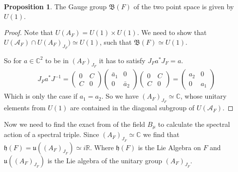 \documentclass[a4paper]{article}
\theoremstyle{definition}
\theoremstyle{definition}
\theoremstyle{definition}
\theoremstyle{theorem}
\theoremstyle{theorem}
\theoremstyle{theorem}
\newtheorem{proposition}{Proposition}
\begin{document}
    \begin{proposition}
        The Gauge group $\mathfrak{B}(F)$ of the two point space is given by
        $U(1)$.
    \end{proposition}
    \begin{proof}
        Note that $U(A_F) = U(1) \times U(1)$. We need to show that
        $U(\mathcal{A}_F)
        \cap U(A_F)_{J_F}) \simeq U(1)$, such that $\mathfrak{B}(F)
        \simeq U(1)$.\newline

        So for $a \in \mathbb{C}^2$ to be in $(A_F)_{J_F}$ it has
        to satisfy $J_F a^* J_F = a$.
        \begin{align}
            J_F a^* J^{-1} =
            \begin{pmatrix}0&C\\C&0\end{pmatrix}
                \begin{pmatrix}\bar{a}_1&0\\0&\bar{a}_2\end{pmatrix}
            \begin{pmatrix}0&C\\C&0\end{pmatrix}
                =
                \begin{pmatrix}a_2&0\\0&a_1\end{pmatrix}
        \end{align}
        Which is only the case if $a_1 = a_2$. So we have
        $(A_F)_{J_F} \simeq \mathbb{C}$, whose unitary elements
        from $U(1)$ are contained in the diagonal subgroup of
        $U(\mathcal{A}_F)$.
    \end{proof}

    Now we need to find the exact from of the field $B_\mu$ to calculate the
    spectral action of a spectral triple. Since $(A_F)_{J_F} \simeq
    \mathbb{C}$ we find that $\mathfrak{h}(F) = \mathfrak{u}((A_F)_{J_F})
    \simeq i\mathbb{R}$. Where $\mathfrak{h}(F)$ is the Lie Algebra on $F$
    and $\mathfrak{u}((A_F)_{J_F})$ is the Lie algebra of the unitary group
    $(A_F)_{J_F}$.\newline
\end{document}
